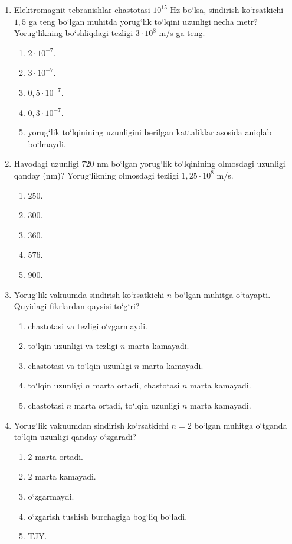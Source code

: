 \begin{enumerate}
\item Elektromagnit tebranishlar chastotasi $10^{15}$ Hz bo‘lsa, sindirish ko‘rsatkichi $1,5$ ga teng bo‘lgan muhitda yorug‘lik to‘lqini uzunligi necha metr? Yorug‘likning bo‘shliqdagi tezligi $3\cdot10^8$ m/s ga teng.
\begin{enumerate}[label=\Alph*)]
\item $2\cdot10^{-7}$.
\item $3\cdot10^{-7}$.
\item $0,5\cdot10^{-7}$.
\item $0,3\cdot10^{-7}$.
\item yorug‘lik to‘lqinining uzunligini berilgan kattaliklar asosida aniqlab bo‘lmaydi.
\end{enumerate}

\item Havodagi uzunligi $720$ nm bo‘lgan yorug‘lik to‘lqinining olmosdagi uzunligi qanday (nm)? Yorug‘likning olmosdagi tezligi $1,25\cdot10^8$ m/s.
\begin{enumerate}[label=\Alph*)]
\item $250$.
\item $300$.
\item $360$.
\item $576$.
\item $900$.
\end{enumerate}

\item Yorug‘lik vakuumda sindirish ko‘rsatkichi $n$ bo‘lgan muhitga o‘tayapti. Quyidagi fikrlardan qaysisi to‘g‘ri?
\begin{enumerate}[label=\Alph*)]
\item chastotasi va tezligi o‘zgarmaydi.
\item to‘lqin uzunligi va tezligi $n$ marta kamayadi.
\item chastotasi va to‘lqin uzunligi $n$ marta kamayadi.
\item to‘lqin uzunligi $n$ marta ortadi, chastotasi $n$ marta kamayadi.
\item chastotasi $n$ marta ortadi, to‘lqin uzunligi $n$ marta kamayadi.
\end{enumerate}

\item Yorug‘lik vakuumdan sindirish ko‘rsatkichi $n=2$ bo‘lgan muhitga o‘tganda to‘lqin uzunligi qanday o‘zgaradi?
\begin{enumerate}[label=\Alph*)]
\item $2$ marta ortadi.
\item $2$ marta kamayadi.
\item o‘zgarmaydi.
\item o‘zgarish tushish burchagiga bog‘liq bo‘ladi.
\item TJY.
\end{enumerate}


\end{enumerate}
